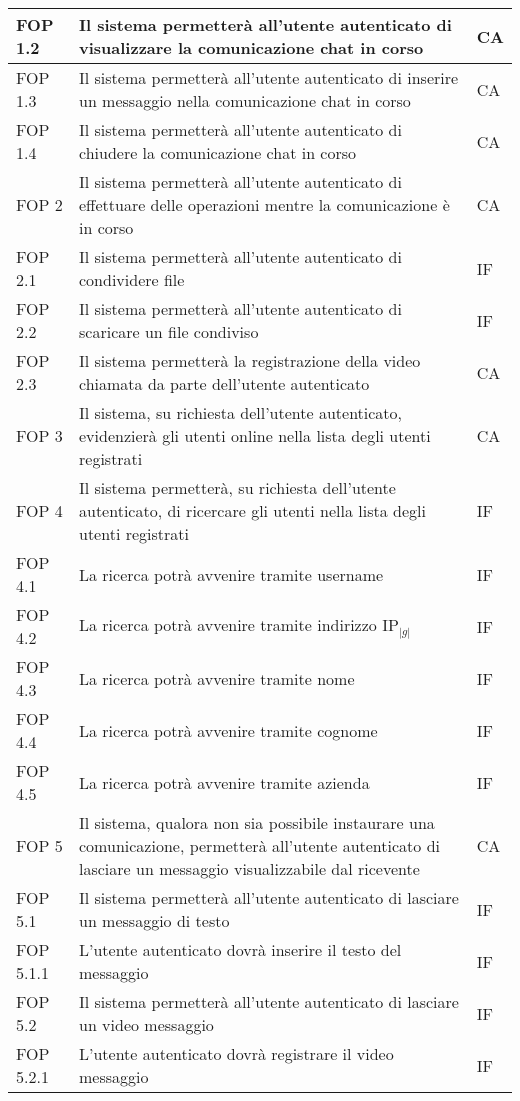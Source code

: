 \begin{longtable}{p{} p{} p{} }
\midrule
FOP 1.2 & Il sistema permetterà all'utente autenticato di visualizzare la comunicazione chat in corso & CA\\

\midrule
FOP 1.3 & Il sistema permetterà all'utente autenticato di inserire un messaggio nella comunicazione chat in corso & CA\\

\midrule
FOP 1.4 & Il sistema permetterà all'utente autenticato di chiudere la comunicazione chat in corso & CA\\

\midrule
FOP 2 & Il sistema permetterà all'utente autenticato di effettuare delle operazioni mentre la comunicazione è in corso & CA\\
\midrule
FOP 2.1 & Il sistema permetterà all'utente autenticato di condividere file & IF\\
\midrule
FOP 2.2 & Il sistema permetterà all'utente autenticato di scaricare un file condiviso & IF\\
\midrule
FOP 2.3 & Il sistema permetterà la registrazione della video chiamata da parte dell'utente autenticato & CA\\

\midrule
FOP 3 & Il sistema, su richiesta dell'utente autenticato, evidenzierà gli utenti online nella lista degli utenti registrati & CA\\

\midrule
FOP 4 & Il sistema permetterà, su richiesta dell'utente autenticato, di ricercare gli utenti nella lista degli utenti registrati & IF\\
\midrule
FOP 4.1 & La ricerca potrà avvenire tramite username & IF\\
\midrule
FOP 4.2 & La ricerca potrà avvenire tramite indirizzo IP$_{|g|}$ & IF\\
\midrule
FOP 4.3 & La ricerca potrà avvenire tramite nome & IF\\
\midrule
FOP 4.4 & La ricerca potrà avvenire tramite cognome & IF\\
\midrule
FOP 4.5 & La ricerca potrà avvenire tramite azienda & IF\\

\midrule
FOP 5 & Il sistema, qualora non sia possibile instaurare una comunicazione, permetterà all'utente autenticato di lasciare un messaggio visualizzabile dal ricevente & CA\\

\midrule
FOP 5.1 & Il sistema permetterà all'utente autenticato di lasciare un messaggio di testo & IF\\
\midrule
FOP 5.1.1 & L'utente autenticato dovrà inserire il testo del messaggio & IF\\

\midrule
FOP 5.2 & Il sistema permetterà all'utente autenticato di lasciare un video messaggio & IF\\
\midrule
FOP 5.2.1 & L'utente autenticato dovrà registrare il video messaggio & IF\\

\end{longtable}
\newpage


